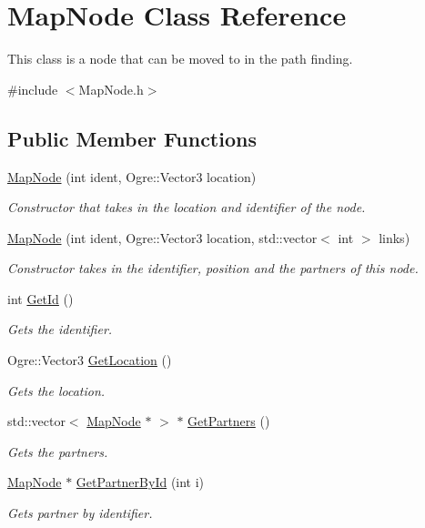 \hypertarget{class_map_node}{\section{Map\-Node Class Reference}
\label{class_map_node}
}


This class is a node that can be moved to in the path finding.  




{\ttfamily \#include $<$Map\-Node.\-h$>$}

\subsection*{Public Member Functions}
\begin{DoxyCompactItemize}
\item 
\hyperlink{class_map_node_a19bb10d68456bbfeff7a34432a20cbe2}{Map\-Node} (int ident, Ogre\-::\-Vector3 location)
\begin{DoxyCompactList}\small\item\em Constructor that takes in the location and identifier of the node. \end{DoxyCompactList}\item 
\hyperlink{class_map_node_a3fbf3e9a65ac7ab73bb6fa69c2059462}{Map\-Node} (int ident, Ogre\-::\-Vector3 location, std\-::vector$<$ int $>$ links)
\begin{DoxyCompactList}\small\item\em Constructor takes in the identifier, position and the partners of this node. \end{DoxyCompactList}\item 
int \hyperlink{class_map_node_a340b6649ca8e0b90fe93dcbb327fa789}{Get\-Id} ()
\begin{DoxyCompactList}\small\item\em Gets the identifier. \end{DoxyCompactList}\item 
Ogre\-::\-Vector3 \hyperlink{class_map_node_a9e492d78a10bb716056c5da0897bd27d}{Get\-Location} ()
\begin{DoxyCompactList}\small\item\em Gets the location. \end{DoxyCompactList}\item 
std\-::vector$<$ \hyperlink{class_map_node}{Map\-Node} $\ast$ $>$ $\ast$ \hyperlink{class_map_node_a7b2ba63ca49506414267d972834df68d}{Get\-Partners} ()
\begin{DoxyCompactList}\small\item\em Gets the partners. \end{DoxyCompactList}\item 
\hyperlink{class_map_node}{Map\-Node} $\ast$ \hyperlink{class_map_node_a78608dc546f904c65a1aa0da63eeb331}{Get\-Partner\-By\-Id} (int i)
\begin{DoxyCompactList}\small\item\em Gets partner by identifier. \end{DoxyCompactList}\end{DoxyCompactItemize}
